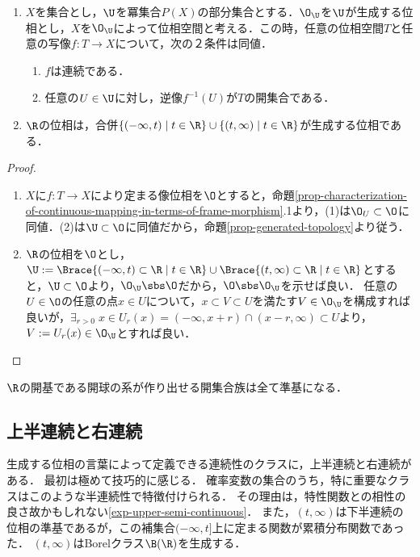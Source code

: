 \documentclass[uplatex,dvipdfmx]{jsreport}
\begin{document}
\begin{proposition}[準基について連続ならば大域的に連続である]\mbox{}\label{prop-continuity-is-determined-by-subbasis}
    \begin{enumerate}
        \item $X$を集合とし，$\U$を冪集合$P(X)$の部分集合とする．$\O_\U$を$\U$が生成する位相とし，$X$を$\O_\U$によって位相空間と考える．この時，任意の位相空間$T$と任意の写像$f:T\to X$について，次の２条件は同値．
        \begin{enumerate}[(1)]
            \item $f$は連続である．
            \item 任意の$U\in\U$に対し，逆像$f^{-1}(U)$が$T$の開集合である．
        \end{enumerate}
        \item $\R$の位相は，合併$\{(-\infty,t)\mid t\in\R\}\cup\{(t,\infty)\mid t\in\R\}$が生成する位相である．
    \end{enumerate}
\end{proposition}
\begin{proof}\mbox{}
    \begin{enumerate}
        \item $X$に$f:T\to X$により定まる像位相を$\O$とすると，命題\ref{prop-characterization-of-continuous-mapping-in-terms-of-frame-morphism}.1より，(1)は$\O_U\subset\O$に同値．(2)は$\U\subset\O$に同値だから，命題\ref{prop-generated-topology}より従う．
        \item $\R$の位相を$\O$とし，$\U:=\Brace{(-\infty,t)\subset\R\mid t\in\R}\cup\Brace{(t,\infty)\subset\R\mid t\in\R}$とすると，$\U\subset\O$より，$\O_\U\sbs\O$だから，$\O\sbs\O_\U$を示せば良い．
        任意の$U\in\O$の任意の点$x\in U$について，$x\subset V\subset U$を満たす$V\in\O_\U$を構成すれば良いが，$\exists_{r>0}\;x\in U_r(x)=(-\infty,x+r)\cap(x-r,\infty)\subset U$より，$V:=U_r(x)\in\O_\U$とすれば良い．
    \end{enumerate}
\end{proof}
\begin{remarks}
    $\R$の開基である開球の系が作り出せる開集合族は全て準基になる．
\end{remarks}

\subsection{上半連続と右連続}

\begin{tcolorbox}[colframe=ForestGreen, colback=ForestGreen!10!white,breakable,colbacktitle=ForestGreen!40!white,coltitle=black,fonttitle=\bfseries\sffamily,
title=]
    生成する位相の言葉によって定義できる連続性のクラスに，上半連続と右連続がある．
    最初は極めて技巧的に感じる．
    確率変数の集合のうち，特に重要なクラスはこのような半連続性で特徴付けられる．
    その理由は，特性関数との相性の良さ故かもしれない\ref{exp-upper-semi-continuous}．
    また，$(t,\infty)$は下半連続の位相の準基であるが，この補集合$(-\infty,t]$上に定まる関数が累積分布関数であった．
    $(t,\infty)$はBorelクラス$\B(\R)$を生成する．
\end{tcolorbox}
\end{document}
